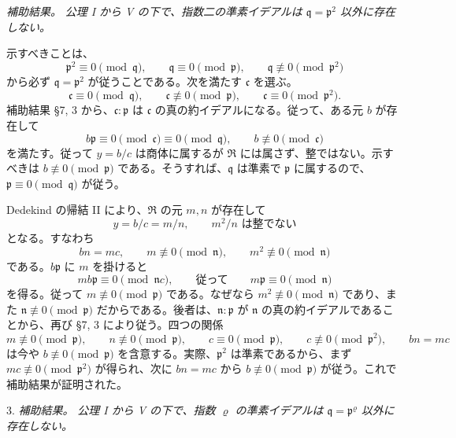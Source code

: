 \documentclass[11pt]{article}
\providecommand{\mR}{\mathfrak{R}}
\providecommand{\mc}{\mathfrak{c}}
\providecommand{\mn}{\mathfrak{n}}
\providecommand{\mpideal}{\mathfrak{p}}
\providecommand{\mq}{\mathfrak{q}}
\begin{document}
\emph{補助結果。} \emph{公理 I から V の下で、指数二の準素イデアルは $\mq=\mpideal^2$ 以外に存在しない。}

示すべきことは、
\[
        \mpideal^2\equiv0\pmod{\mq},
        \qquad \mq\equiv0\pmod{\mpideal},
        \qquad \mq\not\equiv0\pmod{\mpideal^2}
\]
から必ず $\mq=\mpideal^2$ が従うことである。次を満たす $\mc$ を選ぶ。
\[
        \mc\equiv0\pmod{\mq},
        \qquad \mc\not\equiv0\pmod{\mpideal},
        \qquad \mc\equiv0\pmod{\mpideal^2}.
\]
補助結果 §7, 3 から、$\mc:\mpideal$ は $\mc$ の真の約イデアルになる。従って、ある元 $b$ が存在して
\[
        b\mpideal\equiv0\pmod{\mc}\equiv0\pmod{\mq},
        \qquad b\not\equiv0\pmod{\mc}
\]
を満たす。従って $y=b/c$ は商体に属するが $\mR$ には属さず、整ではない。示すべきは $b\not\equiv0\pmod{\mpideal}$ である。そうすれば、$\mq$ は準素で $\mpideal$ に属するので、$\mpideal\equiv0\pmod{\mq}$ が従う。

Dedekind の帰結 II により、$\mR$ の元 $m,n$ が存在して
\[
        y=b/c=m/n,
        \qquad m^2/n \text{ は整でない}
\]
となる。すなわち
\[
        bn=mc,
        \qquad m\not\equiv0\pmod{\mn},
        \qquad m^2\not\equiv0\pmod{\mn}
\]
である。$b\mpideal$ に $m$ を掛けると
\[
        mb\mpideal\equiv0\pmod{\mn c},
        \qquad\text{従って}\qquad m\mpideal\equiv0\pmod{\mn}
\]
を得る。従って $m\not\equiv0\pmod{\mpideal}$ である。なぜなら $m^2\not\equiv0\pmod{\mn}$ であり、また $\mn\not\equiv0\pmod{\mpideal}$ だからである。後者は、$\mn:\mpideal$ が $\mn$ の真の約イデアルであることから、再び §7, 3 により従う。四つの関係
\[
        m\not\equiv0\pmod{\mpideal},\qquad
        n\not\equiv0\pmod{\mpideal},\qquad
        c\equiv0\pmod{\mpideal},\qquad
        c\not\equiv0\pmod{\mpideal^2},\qquad
        bn=mc
\]
は今や $b\not\equiv0\pmod{\mpideal}$ を含意する。実際、$\mpideal^2$ は準素であるから、まず $mc\not\equiv0\pmod{\mpideal^2}$ が得られ、次に $bn=mc$ から $b\not\equiv0\pmod{\mpideal}$ が従う。これで補助結果が証明された。

3. \emph{補助結果。} \emph{公理 I から V の下で、指数 $\varrho$ の準素イデアルは $\mq=\mpideal^\varrho$ 以外に存在しない。}
\end{document}
